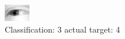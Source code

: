\begin{figure}[h!]
\begin{center}
\includegraphics[width=0.60\columnwidth]{figures/ID2496_class_3_target_4.png}
\end{center}
\caption{ Classification: 3 actual target: 4}
\label{fig:ID2496_class_3_target_4}
\end{figure}
